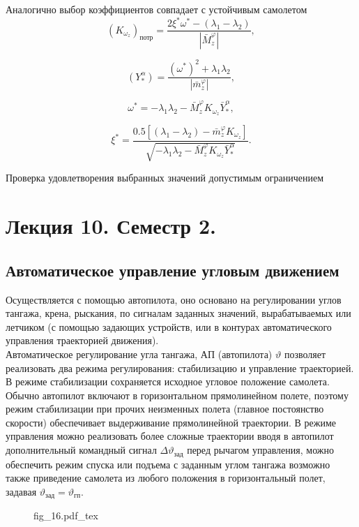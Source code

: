 \documentclass{article}
\begin{document}
Аналогично выбор коэффициентов совпадает с устойчивым самолетом
\[
    (K_{\omega_z})_\text{потр} = \frac{2 \xi^* \omega^* - (\lambda_1 -
    \lambda_2)}{|\bar{M}_z^\varphi|},
\]

\[
    (Y_*^\alpha) = \frac{(\omega^*)^2 + \lambda_1
    \lambda_2}{|\bar{m}_z^\varphi|},
\]

\[
    \omega^* =  - \lambda_1 \lambda_2 - \bar{M}_z^\varphi K_{\omega_z}
    \bar{Y}_*^\alpha,
\]

\[
    \xi^* = \frac{0.5[(\lambda_1 - \lambda_2) - \bar{m}_z^\varphi
    K_{\omega_z}]}{\sqrt{-\lambda_1\lambda_2 - \bar{M}_z^\varphi
K_{\omega_z}\bar{Y}_*^\alpha }}.
\]

Проверка удовлетворения выбранных значений допустимым ограничением

\section{Лекция 10. Семестр 2.}
\subsection{Автоматическое управление угловым движением}
Осуществляется с помощью автопилота, оно основано на регулировании углов
тангажа, крена, рыскания, по сигналам заданных значений, вырабатываемых или
летчиком (с помощью задающих устройств, или в контурах автоматического
управления траекторией движения).\\
Автоматическое регулирование угла тангажа, АП (автопилота) $\vartheta$ позволяет
реализовать два режима регулирования: стабилизацию и управление траекторией.\\
В режиме стабилизации сохраняется исходное угловое положение самолета. Обычно
автопилот включают в горизонтальном прямолинейном полете, поэтому режим
стабилизации при прочих неизменных полета (главное постоянство скорости)
обеспечивает выдерживание прямолинейной траектории. В режиме управления можно
реализовать более сложные траектории вводя в автопилот дополнительный командный 
сигнал $\Delta \vartheta_\text{зад}$ перед рычагом управления, можно обеспечить
режим спуска или подъема с заданным углом тангажа возможно также приведение
самолета из любого положения в горизонтальный полет, задавая
$\vartheta_\text{зад} = \vartheta_\text{гп}$.

\begin{figure}[ht]
    \centering
    {fig_16.pdf_tex}
\end{figure}
\end{document}
